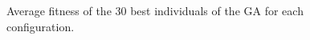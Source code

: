 \documentclass[letterpaper]{article}
\begin{document}
\begin{figure}[htb]
\centering

\caption{Average fitness of the 30 best individuals of the GA for each configuration.}

\label{fig:graph}
\end{figure}
\end{document}
